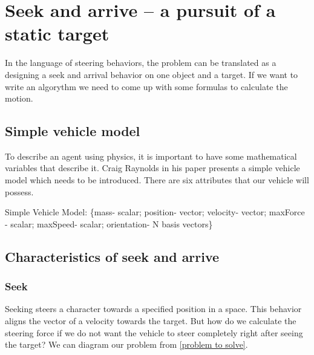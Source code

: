 \documentclass[10pt,twoside,english,a4paper]{article}
\begin{document}
\section{Seek and arrive – a pursuit of a static target} \label{seek and arrive}

In the language of steering behaviors, the problem can be translated as 
a designing a seek and arrival behavior on one object and a target. 
If we want to write an algorythm we need to come up with some 
formulas to calculate the motion.

\subsection{Simple vehicle model} \label{model}
To describe an agent using physics, it is important to have some
mathematical variables that describe it. Craig Raynolds in his 
paper \cite{Raynolds} presents a simple 
vehicle model which needs to be introduced. There are six 
attributes that our vehicle will possess. 

Simple Vehicle Model: \{mass- scalar; position- vector; velocity-	
vector; maxForce - scalar; maxSpeed- scalar; orientation- N basis 
vectors\}

\subsection{Characteristics of seek and arrive } \label{characterictics of seek and arrive}

\subsubsection{Seek} \label{seek}

Seeking steers a character towards a specified position in a space. 
This behavior aligns the vector of a velocity towards the target. 
But how do we calculate the steering force if we do not want the 
vehicle to steer completely right after seeing the target? We can 
diagram our problem from \ref{problem to solve}.
\end{document}
